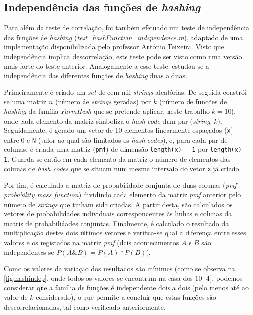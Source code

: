 \documentclass[a4paper,11pt,openright,oneside]{report}
\begin{document}
\subsection{Independência das funções de \textit{hashing}}
\label{subsec.hashindep}

Para além do teste de correlação, foi também efetuado um teste de independência das funções de \textit{hashing} (\textit{test\_hashFunction\_independence.m}), adaptado de uma implementação disponibilizada pelo professor António Teixeira. Visto que independência implica descorrelação, este teste pode ser visto como uma versão mais forte do teste anterior. Analogamente a esse teste, estudou-se a independência das diferentes funções de \textit{hashing} duas a duas.

Primeiramente é criado um \textit{set} de cem mil \textit{strings} aleatórias. De seguida constrói-se uma matriz $n$ (número de \textit{strings} geradas) por $k$ (número de funções de \textit{hashing} da família \textit{FarmHash} que se pretende aplicar, neste trabalho $k = 10$),  onde cada elemento da matriz simboliza o \textit{hash code} dum par (\textit{string}, $k$). Seguidamente, é gerado um vetor de 10 elementos linearmente espaçados (\texttt{x}) entre 0 e \texttt{N} (valor ao qual são limitados os \textit{hash codes}), e, para cada par de colunas, é criada uma matriz (\texttt{pmf}) de dimensão \verb|length(x) - 1| por \verb|length(x) - 1|. Guarda-se então em cada elemento da matriz o número de elementos das colunas de \textit{hash codes} que se situam num mesmo intervalo do vetor \texttt{x} já criado.

Por fim, é calculada a matriz de probabilidade conjunta de duas colunas (\textit{pmf - probability mass function}) dividindo cada elemento da matriz \textit{pmf} anterior pelo número de \textit{strings} que tinham sido criadas. A partir desta, são calculados os vetores de probabilidades individuais correspondentes às linhas e colunas da matriz de probabilidades conjuntas. Finalmente, é calculado o resultado da multiplicação destes dois últimos vetores e verifica-se qual a diferença entre esses valores e os registados na matriz \textit{pmf} (dois acontecimentos $A$ e $B$ são independentes se $P(A\&B) = P(A) * P(B)$).

Como os valores da variação dos resultados são mínimos (como se observa na \autoref{fig:hashindep}, onde todos os valores se encontram na casa dos $10^-4$), podemos considerar que a família de funções é independente dois a dois (pelo menos até ao valor de $k$ considerado), o que permite a concluir que estas funções são descorrelacionadas, tal como verificado anteriormente.
\end{document}
